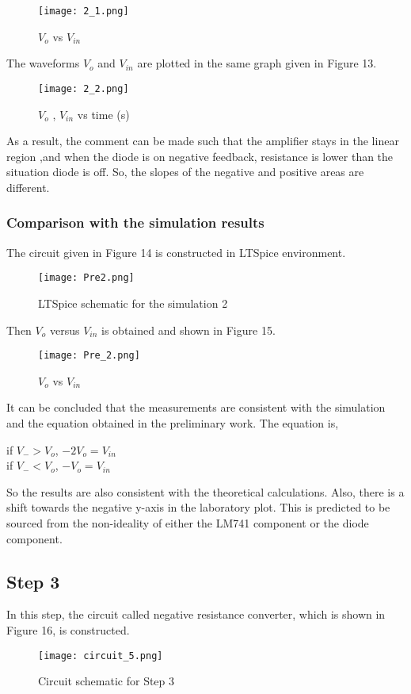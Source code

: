 \documentclass[letterpaper,12pt]{article}
\begin{document}
\begin{figure}[H]
	\centering
   \texttt{[image: 2\_1.png]}
   \caption{\(V_{o}\) vs \(V_{in}\)}
\end{figure}
The waveforms \(V_{o}\) and \(V_{in}\) are plotted in the same graph given in Figure 13.
\begin{figure}[H]
	\centering
   \texttt{[image: 2\_2.png]}
   \caption{\(V_{o}\) , \(V_{in}\) vs time (s) }
\end{figure}
As a result, the comment can be made such that the amplifier stays in the linear region ,and when the diode is on negative feedback, resistance is lower than the situation diode is off. So, the slopes of the negative and positive areas are different.
\subsubsection{Comparison with the simulation results}
The circuit given in Figure 14 is constructed in LTSpice environment.
\begin{figure}[H]
	\centering
   \texttt{[image: Pre2.png]}
   \caption{LTSpice schematic for the simulation 2 }
\end{figure}
Then \(V_{o}\) versus \(V_{in}\) is obtained and shown in Figure 15. 
\begin{figure}[H]
	\centering
   \texttt{[image: Pre\_2.png]}
   \caption{\(V_{o}\) vs \(V_{in}\)}
\end{figure}
It can be concluded that the measurements are consistent with the simulation and the equation obtained in the preliminary work. The equation is,

\begin{center}
if \(V_- > V_o\),  \(-2V_o = V_{in}\) \\
	if \(V_- < V_o\),  \(-V_o = V_{in}\)
\\
\end{center}
So the results are also consistent with the theoretical calculations. Also, there is a shift towards the negative y-axis in the laboratory plot. This is predicted to be sourced from the non-ideality of either the LM741 component or the diode component.
\subsection{Step 3}
In this step, the circuit called negative resistance converter, which is shown in Figure 16, is constructed.  
\begin{figure}[H]
	\centering
   \texttt{[image: circuit\_5.png]}
   \caption{Circuit schematic for Step 3}
\end{figure}
\end{document}
